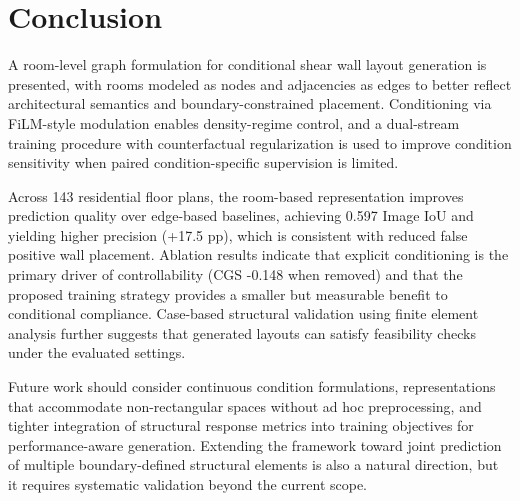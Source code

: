 \section{Conclusion}
\label{sec:conclusion}

A room-level graph formulation for conditional shear wall layout generation is presented, with rooms modeled as nodes and adjacencies as edges to better reflect architectural semantics and boundary-constrained placement. Conditioning via FiLM-style modulation enables density-regime control, and a dual-stream training procedure with counterfactual regularization is used to improve condition sensitivity when paired condition-specific supervision is limited.

Across 143 residential floor plans, the room-based representation improves prediction quality over edge-based baselines, achieving 0.597 Image IoU and yielding higher precision (+17.5 pp), which is consistent with reduced false positive wall placement. Ablation results indicate that explicit conditioning is the primary driver of controllability (CGS -0.148 when removed) and that the proposed training strategy provides a smaller but measurable benefit to conditional compliance. Case-based structural validation using finite element analysis further suggests that generated layouts can satisfy feasibility checks under the evaluated settings.

Future work should consider continuous condition formulations, representations that accommodate non-rectangular spaces without ad hoc preprocessing, and tighter integration of structural response metrics into training objectives for performance-aware generation. Extending the framework toward joint prediction of multiple boundary-defined structural elements is also a natural direction, but it requires systematic validation beyond the current scope.
